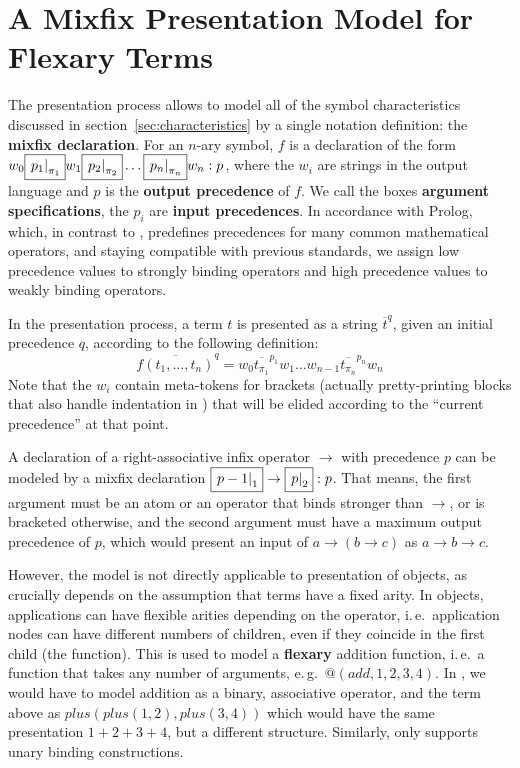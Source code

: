\documentclass[a4paper]{article}
\def\pres#1#2{\overline{#1}^{#2}}
\def\defemph#1{{\bf{#1}}}
\def\imarg#1#2{\fbox{\ensuremath{\left.#1\right|_{#2}}}}
\begin{document}
\section{A Mixfix Presentation Model for Flexary Terms}\label{sec:flexary}
The {\isabelle} presentation process allows to model all of the symbol characteristics
discussed in section~\ref{sec:characteristics} by a single notation definition: the
{\defemph{mixfix declaration}}. For an $n$-ary symbol, $f$ is a declaration of the form
$w_0\imarg{p_1}{\pi_1}w_1\imarg{p_2}{\pi_2}\ldots\imarg{p_n}{\pi_n}w_n:p$, where the $w_i$
are strings in the output language and $p$ is the {\defemph{output precedence}} of $f$. We
call the boxes {\defemph{argument specifications}}, the $p_i$ are {\defemph{input
    precedences}}. In accordance with Prolog, which, in contrast to {\isabelle},
predefines precedences for many common mathematical operators, and staying compatible with
previous {\omdoc} standards, we assign low precedence values to strongly binding operators
and high precedence values to weakly binding operators.

In the presentation process, a term $t$ is presented as a string
$\pres{t}{q}$, given an initial precedence $q$, according to the following definition:
\[\pres{f(t_1,\ldots,t_n)}{q}=w_0\pres{t_{\pi_1}}{p_1}w_1\ldots w_{n-1}\pres{t_{\pi_n}}{p_n}w_n\]
Note that the $w_i$ contain meta-tokens for brackets (actually pretty-printing blocks that
also handle indentation in {\isabelle}) that will be elided according to the ``current
precedence'' at that point.

A declaration of a right-associative infix operator $\to$ with precedence $p$ can be
modeled by a mixfix declaration $\imarg{p-1}{1}\to\imarg{p}{2}:p$. That means, the first
argument must be an atom or an operator that binds stronger than $\to$, or is bracketed
otherwise, and the second argument must have a maximum output precedence of $p$, which
would present an input of $a\to (b\to c)$ as $a\to b\to c$.

However, the {\isabelle} model is not directly applicable to presentation of {\openmath}
objects, as {\isabelle} crucially depends on the assumption that terms have a fixed arity.
In {\openmath} objects, applications can have flexible arities depending on the operator,
i.\,e.\ application nodes can have different numbers of children, even if they coincide in
the first child (the function). This is used to model a {\defemph{flexary}} addition
function, i.\,e.\ a function that takes any number of arguments, e.\,g.\ $@(add,1,2,3,4)$.
In {\isabelle}, we would have to model addition as a binary, associative operator, and the
term above as $plus(plus(1,2),plus(3,4))$ which would have the same presentation
$1+2+3+4$, but a different structure. Similarly, {\isabelle} only supports unary binding
constructions.
\end{document}

